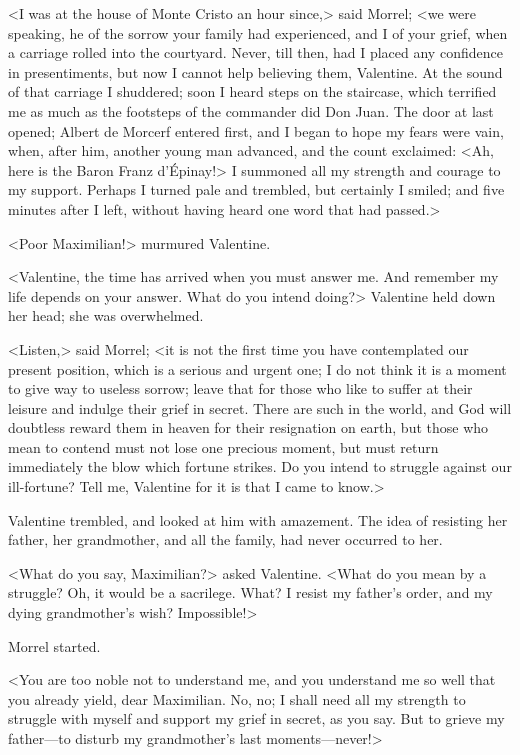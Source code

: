  <I was at the house of Monte Cristo an hour since,> said Morrel; <we were speaking, he of the sorrow your family had experienced, and I of your grief, when a carriage rolled into the courtyard. Never, till then, had I placed any confidence in presentiments, but now I cannot help believing them, Valentine. At the sound of that carriage I shuddered; soon I heard steps on the staircase, which terrified me as much as the footsteps of the commander did Don Juan. The door at last opened; Albert de Morcerf entered first, and I began to hope my fears were vain, when, after him, another young man advanced, and the count exclaimed: <Ah, here is the Baron Franz d'Épinay!> I summoned all my strength and courage to my support. Perhaps I turned pale and trembled, but certainly I smiled; and five minutes after I left, without having heard one word that had passed.> 

 <Poor Maximilian!> murmured Valentine. 

 <Valentine, the time has arrived when you must answer me. And remember my life depends on your answer. What do you intend doing?> Valentine held down her head; she was overwhelmed. 

 <Listen,> said Morrel; <it is not the first time you have contemplated our present position, which is a serious and urgent one; I do not think it is a moment to give way to useless sorrow; leave that for those who like to suffer at their leisure and indulge their grief in secret. There are such in the world, and God will doubtless reward them in heaven for their resignation on earth, but those who mean to contend must not lose one precious moment, but must return immediately the blow which fortune strikes. Do you intend to struggle against our ill-fortune? Tell me, Valentine for it is that I came to know.> 

 Valentine trembled, and looked at him with amazement. The idea of resisting her father, her grandmother, and all the family, had never occurred to her. 

 <What do you say, Maximilian?> asked Valentine. <What do you mean by a struggle? Oh, it would be a sacrilege. What? I resist my father's order, and my dying grandmother's wish? Impossible!> 

 Morrel started. 

 <You are too noble not to understand me, and you understand me so well that you already yield, dear Maximilian. No, no; I shall need all my strength to struggle with myself and support my grief in secret, as you say. But to grieve my father—to disturb my grandmother's last moments—never!> 

